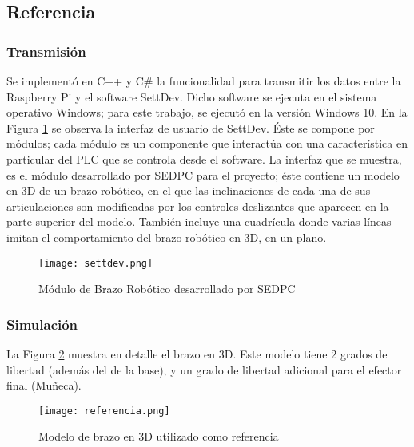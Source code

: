 \subsection{Referencia}

\subsubsection{Transmisión}

Se implementó en C++ y C\# la funcionalidad para transmitir los datos entre la Raspberry Pi y el software SettDev. Dicho software se ejecuta en el sistema operativo Windows; para este trabajo, se ejecutó en la versión Windows 10. En la Figura \ref{fig:settdev} se observa la interfaz de usuario de SettDev. Éste se compone por módulos; cada módulo es un componente que interactúa con una característica en particular del PLC que se controla desde el software. La interfaz que se muestra, es el módulo desarrollado por SEDPC para el proyecto; éste contiene un modelo en 3D de un brazo robótico, en el que las inclinaciones de cada una de sus articulaciones son modificadas por los controles deslizantes que aparecen en la parte superior del modelo. También incluye una cuadrícula donde varias líneas imitan el comportamiento del brazo robótico en 3D, en un plano.

\begin{figure}[htb]
	\centering
	\texttt{[image: settdev.png]}
	\caption{Módulo de Brazo Robótico desarrollado por SEDPC}
	\label{fig:settdev}
\end{figure}

\subsubsection{Simulación}

La Figura \ref{fig:referencia} muestra en detalle el brazo en 3D. Este modelo tiene 2 grados de libertad (además del de la base), y un grado de libertad adicional para el efector final (Muñeca). 

\begin{figure}[htb]
	\centering
	\texttt{[image: referencia.png]}
	\caption{Modelo de brazo en 3D utilizado como referencia}
	\label{fig:referencia}
\end{figure}